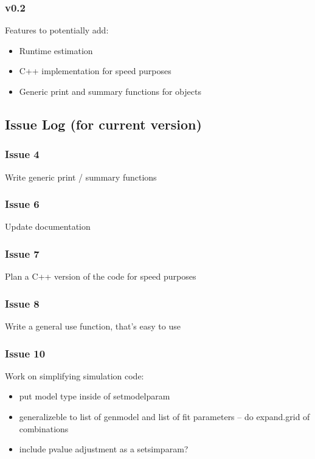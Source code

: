 \documentclass[11pt]{article}
\begin{document}
\subsubsection{v0.2}
Features to potentially add: 
\begin{itemize}
\item Runtime estimation
\item C++ implementation for speed purposes
\item Generic print and summary functions for objects
\end{itemize}



\subsection{Issue Log (for current version)}

\subsubsection*{Issue 4}
Write generic print / summary functions

\subsubsection*{Issue 6}
Update documentation

\subsubsection*{Issue 7}
Plan a C++ version of the code for speed purposes

\subsubsection*{Issue 8}
Write a general use function, that's easy to use

\subsubsection*{Issue 10}
Work on simplifying simulation code: 
\begin{itemize}
\item put model type inside of setmodelparam
\item generalizeble to list of genmodel and list of fit parameters -- do expand.grid of combinations
\item include pvalue adjustment as a setsimparam?
\end{itemize}
\end{document}
